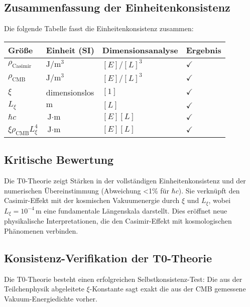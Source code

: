 \documentclass[12pt,a4paper]{article}
\begin{document}
\subsection{Zusammenfassung der Einheitenkonsistenz}
Die folgende Tabelle fasst die Einheitenkonsistenz zusammen:
\begin{table}[h]
	\centering
	\begin{tabular}{l l l l}
		\toprule
		Größe & Einheit (SI) & Dimensionsanalyse & Ergebnis \\
		\midrule
		$\rho_{\text{Casimir}}$ & $\text{J}/\text{m}^3$ & $[E]/[L]^3$ & $\checkmark$ \\
		$\rho_{\text{CMB}}$ & $\text{J}/\text{m}^3$ & $[E]/[L]^3$ & $\checkmark$ \\
		$\xi$ & dimensionslos & $[1]$ & $\checkmark$ \\
		$L_\xi$ & $\text{m}$ & $[L]$ & $\checkmark$ \\
		$\hbar c$ & $\text{J} \cdot \text{m}$ & $[E][L]$ & $\checkmark$ \\
		$\xi \rho_{\text{CMB}} L_\xi^4$ & $\text{J} \cdot \text{m}$ & $[E][L]$ & $\checkmark$ \\
		\bottomrule
	\end{tabular}
\end{table}

\subsection{Kritische Bewertung}
Die T0-Theorie zeigt Stärken in der vollständigen Einheitenkonsistenz und der numerischen Übereinstimmung (Abweichung <1\% für $\hbar c$). Sie verknüpft den Casimir-Effekt mit der kosmischen Vakuumenergie durch $\xi$ und $L_\xi$, wobei $L_\xi = 10^{-4} \, \text{m}$ eine fundamentale Längenskala darstellt. Dies eröffnet neue physikalische Interpretationen, die den Casimir-Effekt mit kosmologischen Phänomenen verbinden.
	
	\subsection{Konsistenz-Verifikation der T0-Theorie}
	
	\begin{revolutionary}
		Die T0-Theorie besteht einen erfolgreichen Selbstkonsistenz-Test: Die aus der Teilchenphysik abgeleitete $\xi$-Konstante sagt exakt die aus der CMB gemessene Vakuum-Energiedichte vorher.
	\end{revolutionary}
	
\end{document}
